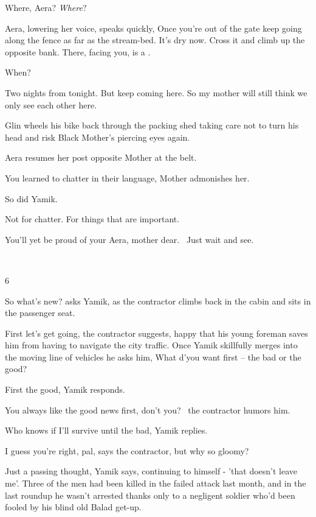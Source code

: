 \documentclass[letterpaper]{article}
\begin{document}
{\textquotedbl}Where, Aera? \textit{Where}?{\textquotedbl}

Aera, lowering her voice, speaks quickly, {\textquotedbl}Once you're out of the gate keep going along the fence as far
as the stream-bed. It's dry now. Cross it and climb up the opposite bank. There, facing you, is a .{\textquotedbl}

{\textquotedbl}When?{\textquotedbl}

{\textquotedbl}Two nights from tonight. But keep coming here. So my mother will still think we only see each other
here.{\textquotedbl}

Glin wheels his bike back through the packing shed taking care not to turn his head and risk Black Mother's piercing
eyes again.

Aera resumes her post opposite Mother at the belt. 

{\textquotedbl}You learned to chatter in their language,{\textquotedbl} Mother admonishes her.

{\textquotedbl}So did Yamik.{\textquotedbl}

{\textquotedbl}Not for chatter. For things that are important.{\textquotedbl}

{\textquotedbl}You'll yet be proud of your Aera, mother dear.~ Just wait and see.{\textquotedbl}

~

6 

{\textquotedbl}So what's new?{\textquotedbl} asks Yamik, as the contractor climbs back in the cabin and sits in the
passenger seat. 

{\textquotedbl}First let's get going,{\textquotedbl} the contractor suggests, happy that his young foreman saves him
from having to navigate the city traffic. Once Yamik skillfully merges into the moving line of vehicles he asks him,
{\textquotedbl}What d'you want first -- the bad or the good?{\textquotedbl} 

{\textquotedbl}First the good,{\textquotedbl} Yamik responds. 

{\textquotedbl}You always like the good news first, don't you?{\textquotedbl} \ the contractor humors him. 

{\textquotedbl}Who knows if I'll survive until the bad,{\textquotedbl} Yamik replies.{ }

{\textquotedbl}I guess you're right, pal,{\textquotedbl} says the contractor, {\textquotedbl}but why so
gloomy?{\textquotedbl} 

{\textquotedbl}Just a passing thought,{\textquotedbl} Yamik says, continuing to himself - 'that doesn't leave me'. Three
of the men had been killed in the failed attack last month, and in the last roundup he wasn't arrested thanks only to a
negligent soldier who'd been fooled by his blind old Balad get-up. 
\end{document}
